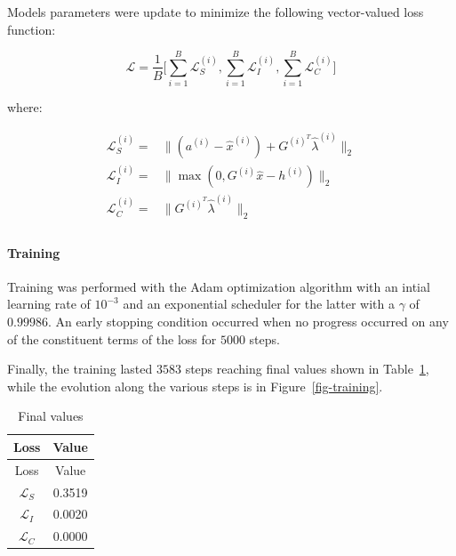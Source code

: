 \documentclass[
]{article}
\let\oldparagraph\paragraph
\renewcommand{\paragraph}[1]{\oldparagraph{#1}\mbox{}}
\begin{document}
Models parameters were update to minimize the following vector-valued
loss function:

\begin{equation}
\mathcal{L} = \frac{1}{B}\biggr[\sum_{i=1}^B\mathcal{L}_{S}^{(i)}, \sum_{i=1}^B\mathcal{L}_{I}^{(i)}, \sum_{i=1}^B\mathcal{L}_{C}^{(i)}\biggr] 
\end{equation}

where:

\begin{align}
    \mathcal{L}_S^{(i)} =& \|(a^{(i)}-\hat{x}^{(i)}) + G^{(i)^{T}}\hat\lambda^{(i)}\|_2\\ 
    \mathcal{L}_{I}^{(i)}  =& \|\max(0, G^{(i)}\hat{x} - h^{(i)})\|_2\\
    \mathcal{L}_{C}^{(i)}  =& \|G^{(i)^{T}}\hat\lambda^{(i)}\|_2\\
\end{align}

\paragraph{Training}\label{training}

Training was performed with the Adam optimization algorithm with an
intial learning rate of \(10^{-3}\) and an exponential scheduler for the
latter with a \(\gamma\) of \(0.99986\). An early stopping condition
occurred when no progress occurred on any of the constituent terms of
the loss for \(5000\) steps.

Finally, the training lasted \(3583\) steps reaching final values shown
in Table~\ref{tbl-training}, while the evolution along the various steps
is in Figure~\ref{fig-training}.

\begin{longtable}[]{@{}cc@{}}
\caption{Final values}\label{tbl-training}\tabularnewline
\toprule\noalign{}
Loss & Value \\
\midrule\noalign{}
\endfirsthead
\toprule\noalign{}
Loss & Value \\
\midrule\noalign{}
\endhead
\bottomrule\noalign{}
\endlastfoot
\(\mathcal{L}_S\) & 0.3519 \\
\(\mathcal{L}_I\) & 0.0020 \\
\(\mathcal{L}_C\) & 0.0000 \\
\end{longtable}
\end{document}
